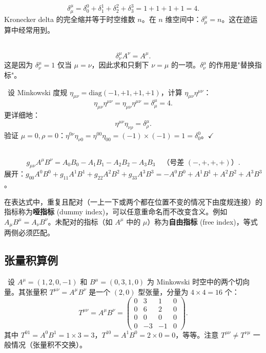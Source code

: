 \
\begin{equation}
    \delta^\mu_\mu = \delta^0_0 + \delta^1_1 + \delta^2_2 + \delta^3_3 = 1 + 1 + 1 + 1 = 4.
\end{equation}
Kronecker delta 的完全缩并等于时空维数 $n$。在 $n$ 维空间中：$\delta^\mu_\mu = n$。这在迹运算中经常用到。

\
\begin{equation}
    \delta^\mu_\nu A^\nu = A^\mu.
\end{equation}
这是因为 $\delta^\mu_\nu = 1$ 仅当 $\mu = \nu$，因此求和只剩下 $\nu = \mu$ 的一项。$\delta^\mu_\nu$ 的作用是"替换指标"。

\
设 Minkowski 度规 $\eta_{\mu\nu} = \text{diag}(-1,+1,+1,+1)$，计算 $\eta_{\mu\nu} \eta^{\mu\nu}$：
\begin{equation}
    \eta_{\mu\nu} \eta^{\mu\nu} = \eta_{\mu\nu} \eta^{\mu\nu} = \delta^\mu_\mu = 4.
\end{equation}
更详细地：
\begin{equation}
    \eta^{\mu\nu} \eta_{\nu\rho} = \delta^\mu_\rho.
\end{equation}
验证 $\mu = 0, \rho = 0$：$\eta^{0\nu} \eta_{\nu 0} = \eta^{00} \eta_{00} = (-1) \times (-1) = 1 = \delta^0_0$。$\checkmark$

\
\begin{equation}
    g_{\mu\nu} A^\mu B^\nu = A_0 B_0 - A_1 B_1 - A_2 B_2 - A_3 B_3 \quad \text{（号差 $(-,+,+,+)$）}.
\end{equation}
展开：$g_{00}A^0 B^0 + g_{11}A^1 B^1 + g_{22}A^2 B^2 + g_{33}A^3 B^3 = -A^0 B^0 + A^1 B^1 + A^2 B^2 + A^3 B^3$。

\begin{remark}[求和约定的哑指标与自由指标]
在表达式中，重复且配对（一上一下或两个都在位置不变的情况下由度规连接）的指标称为\textbf{哑指标} (dummy index)，可以任意重命名而不改变含义。例如 $A_\mu B^\mu = A_\nu B^\nu$。未配对的指标（如 $A^\mu$ 中的 $\mu$）称为\textbf{自由指标} (free index)，等式两侧必须匹配。
\end{remark}

\subsection{张量积算例}

\
设 $A^\mu = (1, 2, 0, -1)$ 和 $B^\mu = (0, 3, 1, 0)$ 为 Minkowski 时空中的两个切向量。其张量积 $T^{\mu\nu} = A^\mu B^\nu$ 是一个 $(2,0)$ 型张量，分量为 $4 \times 4 = 16$ 个：
\begin{equation}
    T^{\mu\nu} = A^\mu B^\nu = 
    \begin{pmatrix}
        0 & 3  & 1  & 0 \\
        0 & 6  & 2  & 0 \\
        0 & 0  & 0  & 0 \\
        0 & -3 & -1 & 0
    \end{pmatrix}.
\end{equation}
其中 $T^{01} = A^0 B^1 = 1 \times 3 = 3$，$T^{10} = A^1 B^0 = 2 \times 0 = 0$，等等。注意 $T^{\mu\nu} \neq T^{\nu\mu}$ 一般情况（张量积不交换）。

